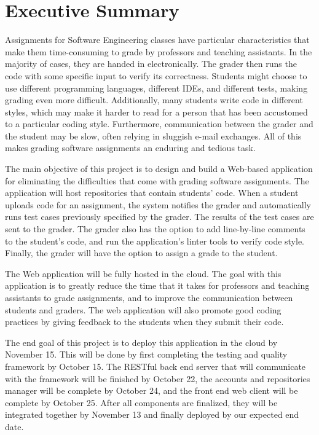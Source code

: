 \part*{Executive Summary}

Assignments for Software Engineering classes have particular characteristics
that make them time-consuming to grade by professors and teaching assistants. In
the majority of cases, they are handed in electronically. The grader then runs
the code with some specific input to verify its correctness. Students might
choose to use different programming languages, different IDEs, and different
tests, making grading even more difficult. Additionally, many students write
code in different styles, which may make it harder to read for a person that has
been accustomed to a particular coding style. Furthermore, communication between
the grader and the student may be slow, often relying in sluggish e-mail
exchanges. All of this makes grading software assignments an enduring and
tedious task.

The main objective of this project is to design and build a Web-based
application  for eliminating the difficulties that come with grading software
assignments. The application will host repositories that contain students' code.
When a student uploads code for an assignment, the system notifies the grader
and automatically runs test cases previously specified by the grader. The
results of the test cases are sent to the grader. The grader also has the option
to add line-by-line comments to the student's code, and run the application's
linter tools to verify code style. Finally, the grader will have the option to
assign a grade to the student.

The Web application will be fully hosted in the cloud. The goal with this
application is to greatly reduce the time that it takes for professors and
teaching assistants to grade assignments, and to improve the communication
between students and graders. The web application will also promote good coding
practices by giving feedback to the students when they submit their code.

The end goal of this project is to deploy this application in the cloud by
November 15. This will be done by first completing the testing and quality
framework by October 15. The RESTful back end server that will communicate
with the framework will be finished by October 22, the accounts and repositories
manager will be complete by October 24, and the front end web client will be
complete by October 25. After all components are finalized, they will be
integrated together by November 13 and finally deployed by our expected end
date.

